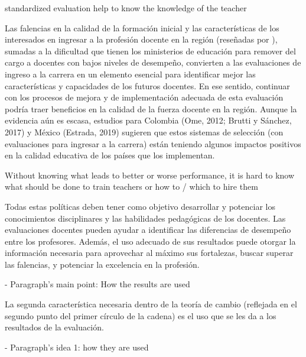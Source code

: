 standardized evaluation help to know the knowledge of the teacher

\citep{Hincapie_et_al_2020}
Las falencias en la calidad de la formación inicial y las características de los interesados
en ingresar a la profesión docente en la región (reseñadas por \citep{Elacqua_et_al_2018}), sumadas a la dificultad que tienen los ministerios de educación para remover del cargo a docentes con bajos niveles de desempeño, convierten a las evaluaciones de ingreso a la carrera en un elemento esencial para identificar mejor las características y capacidades de los futuros docentes. En ese sentido, continuar con los procesos de mejora y de implementación adecuada de esta evaluación podría traer beneficios en la calidad de la fuerza docente en la región. Aunque la evidencia aún es escasa, estudios para Colombia (Ome, 2012; Brutti y Sánchez, 2017) y México (Estrada, 2019) sugieren que estos sistemas de selección (con evaluaciones para ingresar a la carrera) están teniendo algunos impactos positivos en la calidad educativa de los países que los implementan.



Without knowing what leads to better or worse performance, it is hard to know what should be done to train teachers or how to / which to hire them \citep{Hanushek_et_al_2012}







Todas estas políticas deben tener como objetivo desarrollar y potenciar los conocimientos disciplinares y las habilidades pedagógicas de los docentes. Las evaluaciones docentes pueden ayudar a identificar las diferencias de desempeño entre los profesores. Además, el uso adecuado de sus resultados puede otorgar la información necesaria para aprovechar al máximo sus fortalezas, buscar superar las falencias, y potenciar la excelencia en la profesión. \citep{Hincapie_et_al_2020}




- Paragraph's main point: How the results are used

La segunda característica necesaria dentro de la teoría de cambio (reflejada en el segundo punto del primer círculo de la cadena) es el uso que se les da a los resultados de la evaluación. \citep{Hincapie_et_al_2020}


- Paragraph's idea 1: how they are used

